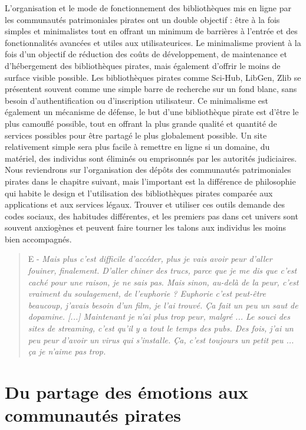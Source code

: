L'organisation et le mode de fonctionnement des bibliothèques mis en ligne par les communautés patrimoniales pirates ont un double objectif : être à la fois simples et minimalistes tout en offrant un minimum de barrières à l'entrée et des fonctionnalités avancées et utiles aux utilisateurices. Le minimalisme provient à la fois d'un objectif de réduction des coûts de développement, de maintenance et d'hébergement des bibliothèques pirates, mais également d'offrir le moins de surface visible possible. Les bibliothèques pirates comme Sci-Hub, LibGen, Zlib se présentent souvent comme une simple barre de recherche sur un fond blanc, sans besoin d'authentification ou d'inscription utilisateur. Ce minimalisme est également un mécanisme de défense, le but d'une bibliothèque pirate est d'être le plus camouflé possible, tout en offrant la plus grande qualité et quantité de services possibles pour être partagé le plus globalement possible. Un site relativement simple sera plus facile à remettre en ligne si un domaine, du matériel, des individus sont éliminés ou emprisonnés par les autorités judiciaires. Nous reviendrons sur l'organisation des dépôts des communautés patrimoniales pirates dans le chapitre suivant, mais l'important est la différence de philosophie qui habite le design et l'utilisation des bibliothèques pirates comparée aux applications et aux services légaux. Trouver et utiliser ces outils demande des codes sociaux, des habitudes différentes, et les premiers pas dans cet univers sont souvent anxiogènes et peuvent faire tourner les talons aux individus les moins bien accompagnés.

\begin{quote}
    E - \textit{Mais plus c'est difficile d'accéder, plus je vais avoir peur d'aller fouiner, finalement. D'aller chiner des trucs, parce que je me dis que c'est caché pour une raison, je ne sais pas. Mais sinon, au-delà de la peur, c'est vraiment du soulagement, de l'euphorie ? Euphorie c'est peut-être beaucoup, j'avais besoin d'un film, je l'ai trouvé. Ça fait un peu un saut de dopamine. [...] Maintenant je n'ai plus trop peur, malgré ... Le souci des sites de streaming, c'est qu'il y a tout le temps des pubs. Des fois, j'ai un peu peur d'avoir un virus qui s'installe. Ça, c'est toujours un petit peu ... ça je n'aime pas trop.}
\end{quote}

\section{Du partage des émotions aux communautés pirates }

